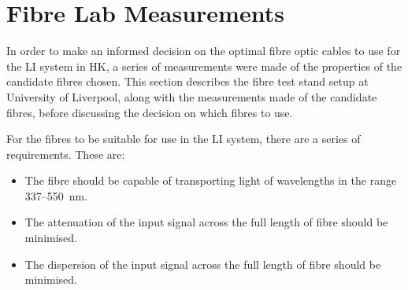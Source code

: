 \documentclass[a4paper,11pt]{article}
\begin{document}
\section{Fibre Lab Measurements}

In order to make an informed decision on the optimal fibre optic cables to use for the LI system in HK, a series of measurements were made of the properties of the candidate fibres chosen. This section describes the fibre test stand setup at University of Liverpool, along with the measurements made of the candidate fibres, before discussing the decision on which fibres to use.

For the fibres to be suitable for use in the LI system, there are a series of requirements. These are:
\begin{itemize}
\item The fibre should be capable of transporting light of wavelengths in the range 337--550~nm.
\item The attenuation of the input signal across the full length of fibre should be minimised.
\item The dispersion of the input signal across the full length of fibre should be minimised.
\end{itemize}
\end{document}
